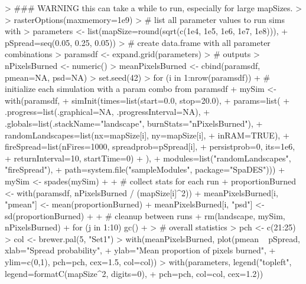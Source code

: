 \documentclass{article}
\begin{document}
\begin{Schunk}
\begin{Sinput}
> ### WARNING this can take a while to run, especially for large mapSizes.
> 
> rasterOptions(maxmemory=1e9)
> # list all parameter values to run sims with
> parameters <- list(mapSize=round(sqrt(c(1e4, 1e5, 1e6, 1e7, 1e8))),
+                    pSpread=seq(0.05, 0.25, 0.05))
> # create data.frame with all parameter combinations
> paramsdf <- expand.grid(parameters)
> # outputs
> nPixelsBurned <- numeric()
> meanPixelsBurned <- cbind(paramsdf, pmean=NA, psd=NA)
> set.seed(42)
> for (i in 1:nrow(paramsdf)) {
+   # initialize each simulation with a param combo from paramsdf
+   mySim <- with(paramsdf,
+                 simInit(times=list(start=0.0, stop=20.0),
+                         params=list(
+                           .progress=list(.graphical=NA, .progressInterval=NA),
+                           .globals=list(.stackName="landscape", burnStats="nPixelsBurned"),
+                           randomLandscapes=list(nx=mapSize[i], ny=mapSize[i],
+                                                 inRAM=TRUE),
+                           fireSpread=list(nFires=1000, spreadprob=pSpread[i],
+                                           persistprob=0, its=1e6,
+                                           returnInterval=10, startTime=0)
+                           ),
+                         modules=list("randomLandscapes", "fireSpread"),
+                         path=system.file("sampleModules", package="SpaDES")))
+   mySim <- spades(mySim)
+ 
+   # collect stats for each run
+   proportionBurned <- with(paramsdf, nPixelsBurned / (mapSize[i]^2))
+   meanPixelsBurned[i, "pmean"] <- mean(proportionBurned)
+   meanPixelsBurned[i, "psd"] <- sd(proportionBurned)
+ 
+   # cleanup between runs
+   rm(landscape, mySim, nPixelsBurned)
+   for (j in 1:10) gc()
+ }
> # overall statistics
> pch <- c(21:25)
> col <- brewer.pal(5, "Set1")
> with(meanPixelsBurned, plot(pmean ~ pSpread, xlab="Spread probability",
+                             ylab="Mean proportion of pixels burned",
+                             ylim=c(0,1), pch=pch, cex=1.5, col=col))
> with(parameters, legend("topleft", legend=formatC(mapSize^2, digits=0),
+                               pch=pch, col=col, cex=1.2))
\end{Sinput}
\end{Schunk}
\end{document}
